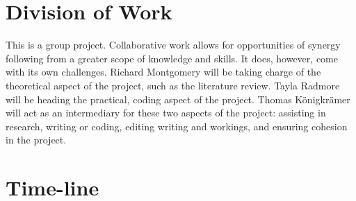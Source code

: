 \documentclass[12pt,a4paper]{article}
\begin{document}
\section{Division of Work}
\label{sec:dow} 

This is a group project. Collaborative work allows for opportunities of synergy following from a greater scope of knowledge and skills. It does, however, come with its own challenges. Richard Montgomery will be taking charge of the theoretical aspect of the project, such as the literature review. Tayla Radmore will be heading the practical, coding aspect of the project. Thomas K{\"o}nigkr{\"a}mer will act as an intermediary for these two aspects of the project: assisting in research, writing or coding, editing writing and workings, and ensuring cohesion in the project.

\section{Time-line}
\label{sec:time}
\end{document}
